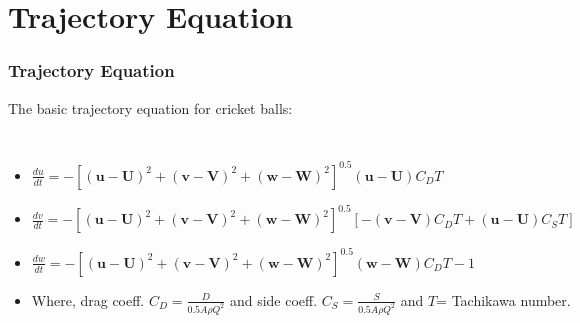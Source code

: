 \documentclass{beamer}
\renewcommand{\vec}[1]{\mathbf{#1}}
\begin{document}
\section{Trajectory Equation}
\begin{frame}
\frametitle{Trajectory Equation}
The basic trajectory equation for cricket balls:\\
\begin{columns}
  \begin{itemize}
  \item 
  $\frac{du}{dt}=-[(\vec{u}-\vec{U})^2+(\vec{v}-\vec{V})^2+(\vec{w}-\vec{W})^2]^{0.5}(\vec{u}-\vec{U})C_D T$
  
  \item $\frac{dv}{dt}=-[(\vec{u}-\vec{U})^2+(\vec{v}-\vec{V})^2+(\vec{w}-\vec{W})^2]^{0.5}[-(\vec{v}-\vec{V})C_D T+(\vec{u}-\vec{U})C_S T]$
  
  \item $\frac{dw}{dt}=-[(\vec{u}-\vec{U})^2+(\vec{v}-\vec{V})^2+(\vec{w}-\vec{W})^2]^{0.5}(\vec{w}-\vec{W})C_D T - 1$
  
  \item Where, drag coeff. $C_D = \frac{D}{0.5A \rho Q^2}$ and side coeff. $C_S = \frac{S}{0.5A \rho Q^2}$ and $T$= Tachikawa number.
%  
  
  \end{itemize}
\end{columns}


\end{frame}
\end{document}
